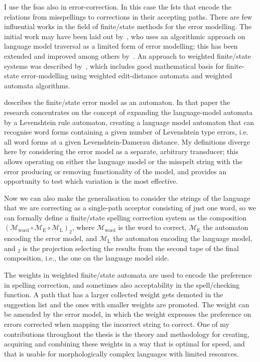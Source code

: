 \documentclass[officiallayout,final]{unihelcompling}
\begin{document}
I use the \glspl{fsa} also in error-correction. In this case the
\glspl{fst} that encode the relations from
misspellings to corrections in their accepting paths. There are few influential
works in the field of finite\-/state methods for the error modelling. The
initial work may have been laid out by~\citet{oflazer1996errortolerant}, who
uses an algorithmic approach on language model traversal as a limited form of
error modelling; this has been extended and improved among others
by~\citet{hulden2009fast}.  An approach to weighted finite\-/state systems was
described by~\citet{mohri2003edit}, which includes good mathematical basis for
finite-state error-modelling using weighted edit-distance automata and weighted
automata algorithms. 

\citet{agata2002typographical} describes the finite\-/state error model
as an automaton. In that paper the research concentrates on the
concept of expanding the language-model automata by a Levenshtein rule
automaton, creating a language model automaton that can recognise word forms
containing a given number of Levenshtein type errors, i.e. all word forms at a
given Levenshtein-Damerau distance. My definitions diverge here by considering
the error model as a separate, arbitrary transducer; this allows
operating on either the language model or the misspelt string with the error
producing or removing functionality of the model, and provides an opportunity
to test which variation is the most effective. 

Now we can also make the generalisation to consider the strings of the language
that we are correcting as a single-path acceptor consisting of just one word,
so we can formally define a finite\-/state spelling correction
system as the composition $(\mathcal{M}_\mathrm{word} \circ
\mathcal{M}_\mathrm{E} \circ \mathcal{M}_\mathrm{L})_2$, where
$\mathcal{M}_\mathrm{word}$ is the word to correct, $\mathcal{M}_\mathrm{E}$
the automaton encoding the error model, and $\mathcal{M}_\mathrm{L}$ the
automaton encoding the language model, and $_2$ is the projection selecting the
results from the second tape of the final composition, i.e., the one on the
language model side.

The weights in weighted finite\-/state automata are used to encode the
preference in spelling correction, and sometimes also acceptability in the
spell\-/checking function. A path that has a larger collected weight gets
demoted in the suggestion list and the ones with smaller weights are promoted.
The weight can be amended by the error model, in which the weight expresses the
preference on errors corrected when mapping the incorrect string to correct.
One of my contributions throughout the thesis is the theory and methodology for
creating, acquiring and combining these weights in a way that is optimal for
speed, and that is usable for morphologically complex languages with limited
resources.
\end{document}
